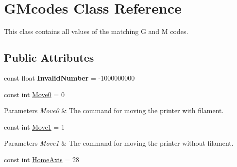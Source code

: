 \hypertarget{class_g_mcodes}{}\section{G\+Mcodes Class Reference}
\label{class_g_mcodes}


This class contains all values of the matching G and M codes.  


\subsection*{Public Attributes}
\begin{DoxyCompactItemize}
\item 
\mbox{\label{class_g_mcodes_ad6e272392e966459b94901074a977ff3}} 
const float {\bfseries Invalid\+Number} = -\/1000000000
\item 
\mbox{\label{class_g_mcodes_ac4f23bb4a68aeb87380906a797ff5cd9}} 
const int \hyperlink{class_g_mcodes_ac4f23bb4a68aeb87380906a797ff5cd9}{Move0} = 0
\begin{DoxyCompactList}\small\item\em 
\begin{DoxyParams}{Parameters}
{\em Move0} & The command for moving the printer with filament.\\
\hline
\end{DoxyParams}
\end{DoxyCompactList}\item 
\mbox{\label{class_g_mcodes_a1b7866302ea84e792d4a0b202fca7572}} 
const int \hyperlink{class_g_mcodes_a1b7866302ea84e792d4a0b202fca7572}{Move1} = 1
\begin{DoxyCompactList}\small\item\em 
\begin{DoxyParams}{Parameters}
{\em Move1} & The command for moving the printer without filament.\\
\hline
\end{DoxyParams}
\end{DoxyCompactList}\item 
\mbox{\label{class_g_mcodes_a8effe1399412977673f4a7d719d9f478}} 
const int \hyperlink{class_g_mcodes_a8effe1399412977673f4a7d719d9f478}{Home\+Axis} = 28
\begin{DoxyCompactList}\small\item\em 

\end{DoxyCompactList}
\end{DoxyCompactItemize}
